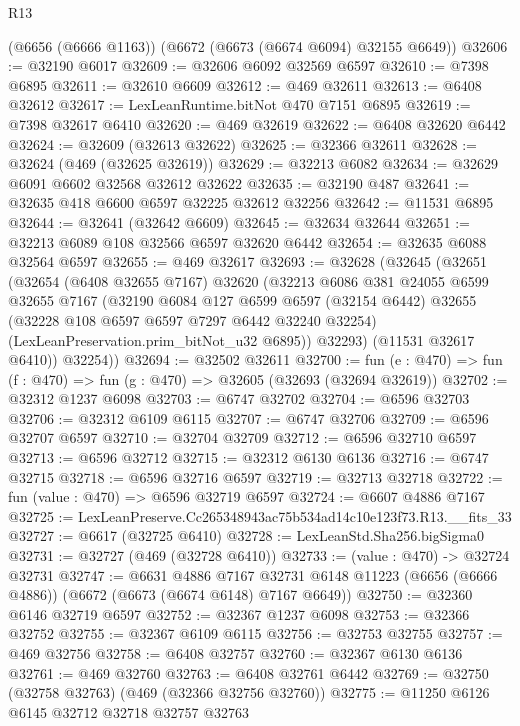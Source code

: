\begin{lexlean}{R13}
\begin{coremodule}
    (@6656 (@6666 @1163))
    (@6672 (@6673 (@6674 @6094) @32155 @6649))
@32606 := @32190 @6017
@32609 := @32606 @6092 @32569 @6597
@32610 := @7398 @6895
@32611 := @32610 @6609
@32612 := @469 @32611
@32613 := @6408 @32612
@32617 := LexLeanRuntime.bitNot @470 @7151 @6895
@32619 := @7398 @32617 @6410
@32620 := @469 @32619
@32622 := @6408 @32620 @6442
@32624 := @32609 (@32613 @32622)
@32625 := @32366 @32611
@32628 := @32624 (@469 (@32625 @32619))
@32629 := @32213 @6082
@32634 := @32629 @6091 @6602 @32568 @32612 @32622
@32635 := @32190 @487
@32641 := @32635 @418 @6600 @6597 @32225 @32612 @32256
@32642 := @11531 @6895
@32644 := @32641 (@32642 @6609)
@32645 := @32634 @32644
@32651 := @32213 @6089 @108 @32566 @6597 @32620 @6442
@32654 := @32635 @6088 @32564 @6597
@32655 := @469 @32617
@32693 := @32628
    (@32645
      (@32651
        (@32654
          (@6408 @32655 @7167)
          @32620
          (@32213
            @6086
            @381
            @24055
            @6599
            @32655
            @7167
            (@32190
              @6084
              @127
              @6599
              @6597
              (@32154 @6442)
              @32655
              (@32228 @108 @6597 @6597 @7297 @6442 @32240 @32254)
              (LexLeanPreservation.prim_bitNot_u32 @6895))
            @32293)
          (@11531 @32617 @6410))
        @32254))
@32694 := @32502 @32611
@32700 := fun (e : @470) => fun (f : @470) => fun (g : @470) => @32605 (@32693 (@32694 @32619))
@32702 := @32312 @1237 @6098
@32703 := @6747 @32702
@32704 := @6596 @32703
@32706 := @32312 @6109 @6115
@32707 := @6747 @32706
@32709 := @6596 @32707 @6597
@32710 := @32704 @32709
@32712 := @6596 @32710 @6597
@32713 := @6596 @32712
@32715 := @32312 @6130 @6136
@32716 := @6747 @32715
@32718 := @6596 @32716 @6597
@32719 := @32713 @32718
@32722 := fun (value : @470) => @6596 @32719 @6597
@32724 := @6607 @4886 @7167
@32725 := LexLeanPreserve.Cc265348943ac75b534ad14c10e123f73.R13.__fits_33
@32727 := @6617 (@32725 @6410)
@32728 := LexLeanStd.Sha256.bigSigma0
@32731 := @32727 (@469 (@32728 @6410))
@32733 := (value : @470) -> @32724 @32731
@32747 := @6631
    @4886
    @7167
    @32731
    @6148
    @11223
    (@6656 (@6666 @4886))
    (@6672 (@6673 (@6674 @6148) @7167 @6649))
@32750 := @32360 @6146 @32719 @6597
@32752 := @32367 @1237 @6098
@32753 := @32366 @32752
@32755 := @32367 @6109 @6115
@32756 := @32753 @32755
@32757 := @469 @32756
@32758 := @6408 @32757
@32760 := @32367 @6130 @6136
@32761 := @469 @32760
@32763 := @6408 @32761 @6442
@32769 := @32750 (@32758 @32763) (@469 (@32366 @32756 @32760))
@32775 := @11250 @6126 @6145 @32712 @32718 @32757 @32763

\end{coremodule}
\end{lexlean}
